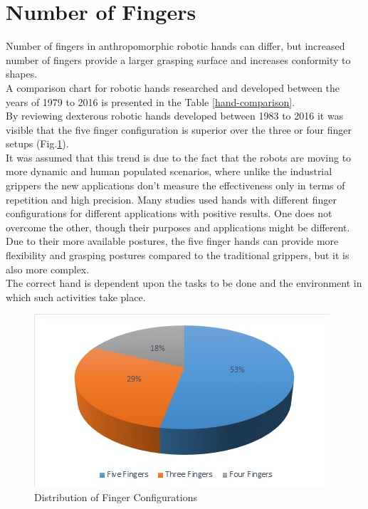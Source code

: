 \documentclass[a4paper, 10pt, conference]{ieeeconf}      %
\begin{document}
\section{\textbf{Number of Fingers}}
Number of fingers in anthropomorphic robotic hands can differ, but increased number of fingers provide a larger grasping surface and increases conformity to shapes.\\
A comparison chart for robotic hands researched and developed between the years of 1979 to 2016 is presented in the Table \ref{hand-comparison}.\\
By reviewing dexterous robotic hands developed between 1983 to 2016 \cite{ramirez20173} it was visible that the five finger configuration is superior over the three or four finger setups (Fig.\ref{fig:DistributionOfFingerConfigurations}).\\
It was assumed that this trend is due to the fact that the robots are moving to more dynamic and human populated scenarios, where unlike the industrial grippers the new applications don't measure the effectiveness only in terms of repetition and high precision. Many studies used hands with different finger configurations for different applications with positive results. One does not overcome the other, though their purposes and applications might be different.\\
Due to their more available postures, the five finger hands can provide more flexibility and grasping postures compared to the traditional grippers, but it is also more complex.\\
The correct hand is dependent upon the tasks to be done and the environment in which such activities take place.\\
\begin{figure}[h!]
\centering  \includegraphics[width=1.0\linewidth]{./images/DistributionOfFingerConfigurations}
  \caption{Distribution of Finger Configurations}
  \label{fig:DistributionOfFingerConfigurations}
	\end{figure}
\end{document}
